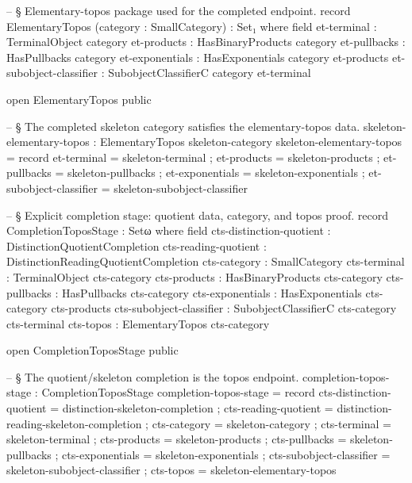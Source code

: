 \documentclass[11pt]{article}
\begin{document}
\begin{code}
-- § Elementary-topos package used for the completed endpoint.
record ElementaryTopos (category : SmallCategory) : Set₁ where
  field
    et-terminal             : TerminalObject category
    et-products             : HasBinaryProducts category
    et-pullbacks            : HasPullbacks category
    et-exponentials         : HasExponentials category et-products
    et-subobject-classifier : SubobjectClassifierC category et-terminal

open ElementaryTopos public

-- § The completed skeleton category satisfies the elementary-topos data.
skeleton-elementary-topos : ElementaryTopos skeleton-category
skeleton-elementary-topos = record
  { et-terminal             = skeleton-terminal
  ; et-products             = skeleton-products
  ; et-pullbacks            = skeleton-pullbacks
  ; et-exponentials         = skeleton-exponentials
  ; et-subobject-classifier = skeleton-subobject-classifier
  }

-- § Explicit completion stage: quotient data, category, and topos proof.
record CompletionToposStage : Setω where
  field
    cts-distinction-quotient : DistinctionQuotientCompletion
    cts-reading-quotient     : DistinctionReadingQuotientCompletion
    cts-category             : SmallCategory
    cts-terminal             : TerminalObject cts-category
    cts-products             : HasBinaryProducts cts-category
    cts-pullbacks            : HasPullbacks cts-category
    cts-exponentials         : HasExponentials cts-category cts-products
    cts-subobject-classifier : SubobjectClassifierC cts-category cts-terminal
    cts-topos                : ElementaryTopos cts-category

open CompletionToposStage public

-- § The quotient/skeleton completion is the topos endpoint.
completion-topos-stage : CompletionToposStage
completion-topos-stage = record
  { cts-distinction-quotient = distinction-skeleton-completion
  ; cts-reading-quotient     = distinction-reading-skeleton-completion
  ; cts-category             = skeleton-category
  ; cts-terminal             = skeleton-terminal
  ; cts-products             = skeleton-products
  ; cts-pullbacks            = skeleton-pullbacks
  ; cts-exponentials         = skeleton-exponentials
  ; cts-subobject-classifier = skeleton-subobject-classifier
  ; cts-topos                = skeleton-elementary-topos
  }
\end{code}
\end{document}
